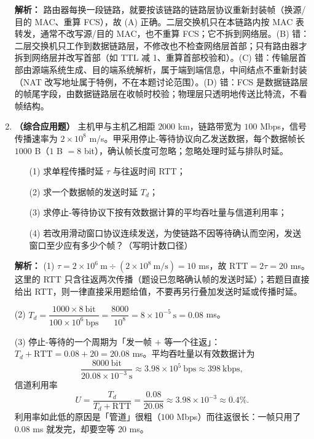 \begin{enumerate}[start=7]
\ifshowsolutions\par\noindent\textbf{解析：} 路由器每换一段链路，就要按该链路的链路层协议重新封装帧（换源/目的 MAC、重算 FCS），故 (A) 正确。二层交换机只在本链路内按 MAC 表转发，通常不改写源/目的 MAC，也不重算 FCS；它不拆到网络层。(B) 错：二层交换机只工作到数据链路层，不修改也不检查网络层首部；只有路由器才拆到网络层并改写首部（如 TTL 减 1、重算首部校验和）。(C) 错：传输层首部由源端系统生成、目的端系统解析，属于端到端信息，中间结点不重新封装（NAT 改写地址属于特例，不在本题讨论范围）。(D) 错：FCS 是数据链路层的帧尾字段，由数据链路层在收帧时校验；物理层只透明地传送比特流，不看帧结构。\else \answerarea[5] \fi

\vspace{8pt}

\item \textbf{（综合应用题）} 主机甲与主机乙相距 $2000$ km，链路带宽为 $100$ Mbps，信号传播速率为 $2\times10^{8}$ m/s。甲采用停止-等待协议向乙发送数据，每个数据帧长 $1000$ B（$1$ B $=8$ bit），确认帧长度可忽略；忽略处理时延与排队时延。
\begin{enumerate}
    \item[(1)] 求单程传播时延 $\tau$ 与往返时间 RTT；
    \item[(2)] 求一个数据帧的发送时延 $T_d$；
    \item[(3)] 求停止-等待协议下按有效数据计算的平均吞吐量与信道利用率；
    \item[(4)] 若改用滑动窗口协议连续发送，为使链路不因等待确认而空闲，发送窗口至少应有多少个帧？（写明计数口径）
\end{enumerate}

\ifshowsolutions\par\noindent\textbf{解析：}
(1) $\tau=2\times10^{6}\ \text{m}\div(2\times10^{8}\ \text{m/s})=10$ ms，故 $\text{RTT}=2\tau=20$ ms。这里的 RTT 只含往返两次传播（题设已忽略确认帧的发送时延）；若题目直接给出 RTT，则一律直接采用题给值，不要再另行叠加发送时延或传播时延。

(2) $T_d=\dfrac{1000\times8\ \text{bit}}{100\times10^{6}\ \text{bps}}=\dfrac{8000}{10^{8}}=8\times10^{-5}\ \text{s}=0.08$ ms。

(3) 停止-等待的一个周期为「发一帧 $+$ 等一个往返」：$T_d+\text{RTT}=0.08+20=20.08$ ms。平均吞吐量以有效数据计为
\[
\frac{8000\ \text{bit}}{20.08\times10^{-3}\ \text{s}}\approx3.98\times10^{5}\ \text{bps}\approx398\ \text{kbps},
\]
信道利用率
\[
U=\frac{T_d}{T_d+\text{RTT}}=\frac{0.08}{20.08}\approx3.98\times10^{-3}\approx0.4\%.
\]
利用率如此低的原因是「管道」很粗（$100$ Mbps）而往返很长：一帧只用了 $0.08$ ms 就发完，却要空等 $20$ ms。


\end{enumerate}
